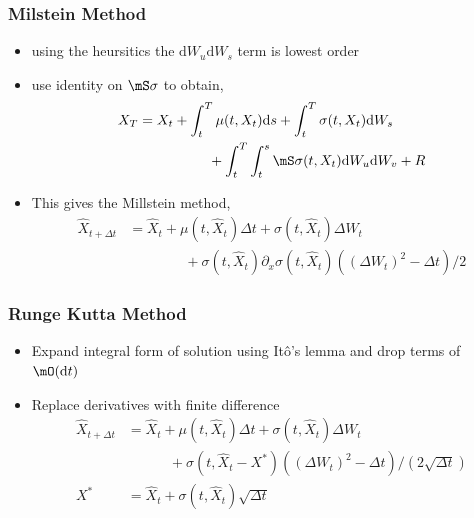 \documentclass{beamer}
\renewcommand{\d}{\ensuremath{\mathrm{d}}}
\begin{document}
\begin{frame}
\frametitle{Milstein Method}
\begin{itemize}
\item using the heursitics the \( \d W_u \d W_s \) term is lowest order
\item use identity on \( \mS \sigma \) to obtain,
{
\begin{align*}
    X_T &= X_t + \int_t^T \mu(t,X_t) \d s + \int_t^T \sigma(t,X_t) \d W_s
    \\&\hspace{5em} + \int_t^T \int_t^s \mS \sigma(t,X_t)  \d W_u \d W_v + R
\end{align*}}
\item This gives the Millstein method,
\begin{align*}
    \hat{X}_{t+\Delta t} &= \hat{X}_t + \mu(t,\hat{X}_{t}) \Delta t + \sigma(t,\hat{X}_{t}) \Delta W_{t}
    \\& \hspace{4em}+ \sigma(t,\hat{X}_t) \partial_x \sigma(t,\hat{X}_t) \left( (\Delta W_t)^2 - \Delta t \right)/2
\end{align*}
\end{itemize}
\end{frame}

\begin{frame}
\frametitle{Runge Kutta Method}
\begin{itemize}
\item Expand integral form of solution using It\^o's lemma and drop terms of \( \mO(\d t) \)
\item Replace derivatives with finite difference
\begin{align*}
    \hat{X}_{t+\Delta t} &= \hat{X}_t + \mu(t,\hat{X}_{t}) \Delta t + \sigma(t,\hat{X}_{t}) \Delta W_{t}
    \\& \hspace{3em} + \sigma(t,\hat{X}_t-X^*) \left( (\Delta W_t)^2 - \Delta t \right) / (2 \sqrt{\Delta t}) \\
    X^* &=  \hat{X}_t  + \sigma(t,\hat{X}_t)\sqrt{\Delta t}
\end{align*}

\end{itemize}
\end{frame}
\end{document}
